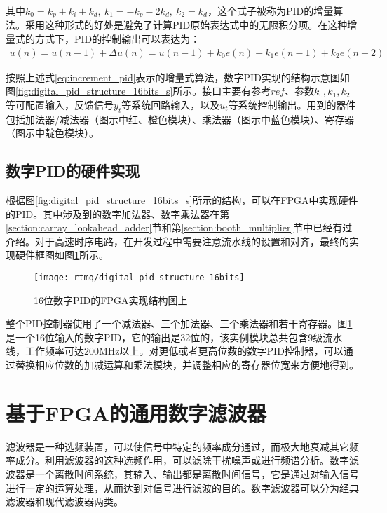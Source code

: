 其中$k_0=k_p+k_i+k_d,\ k_1=-k_p-2k_d,\ k_2=k_d$，这个式子被称为PID的增量算法。采用这种形式的好处是避免了计算PID原始表达式中的无限积分项。在这种增量式的方式下，PID的控制输出可以表达为：
\begin{align}
    u(n)=u(n-1)+\Delta u(n)=u(n-1)+k_0 e(n)+k_1 e(n-1)+k_2 e(n-2)\label{eq:increment_pid}
\end{align}

按照上述式\eqref{eq:increment_pid}表示的增量式算法，数字PID实现的结构示意图如图\ref{fig:digital_pid_structure_16bits_s}所示。接口主要有参考$ref$、参数$k_0, k_1, k_2$等可配置输入，反馈信号$y_t$等系统回路输入，以及$u_t$等系统控制输出。用到的器件包括加法器/减法器（图示中红、橙色模块）、乘法器（图示中蓝色模块）、寄存器（图示中靛色模块）。

\subsection[数字PID的FPGA实现]{数字PID的硬件实现}


根据图\ref{fig:digital_pid_structure_16bits_s}所示的结构，可以在FPGA中实现硬件的PID。其中涉及到的数字加法器、数字乘法器在第\ref{section:carray_lookahead_adder}节和第\ref{section:booth_multiplier}节中已经有过介绍。对于高速时序电路，在开发过程中需要注意流水线的设置和对齐，最终的实现硬件框图如图\ref{fig:digital_pid_structure_16bits}所示。
\begin{figure}
    \centering
    \caption[16位数字PID的FPGA实现结构图]{16位数字PID的FPGA实现结构图上\label{fig:digital_pid_structure_16bits}}
    \texttt{[image: rtmq/digital\_pid\_structure\_16bits]}
\end{figure}

整个PID控制器使用了一个减法器、三个加法器、三个乘法器和若干寄存器。图\ref{fig:digital_pid_structure_16bits}是一个16位输入的数字PID，它的输出是32位的，该实例模块总共包含9级流水线，工作频率可达200MHz以上。对更低或者更高位数的数字PID控制器，可以通过替换相应位数的加减运算和乘法模块，并调整相应的寄存器位宽来方便地得到。




\newpage
\section[基于FPGA的通用数字滤波器]{基于FPGA的通用数字滤波器\label{section:digital_iir}}
滤波器是一种选频装置，可以使信号中特定的频率成分通过，而极大地衰减其它频率成分。利用滤波器的这种选频作用，可以滤除干扰噪声或进行频谱分析。数字滤波器是一个离散时间系统，其输入、输出都是离散时间信号，它是通过对输入信号进行一定的运算处理，从而达到对信号进行滤波的目的。数字滤波器可以分为经典滤波器和现代滤波器两类。
 
